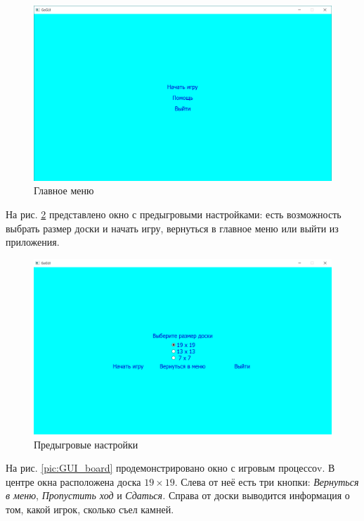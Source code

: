 \begin{figure}[H]
	\begin{center}
		\includegraphics[scale=0.5]{pics/GoGUI/Menu.png}
	    \caption{Главное меню} 
		\label{pic:GUI_Menu}
	\end{center}
\end{figure}

На рис. \ref{pic:GUI_Settings} представлено окно с предыгровыми настройками: есть возможность выбрать размер доски и начать игру, вернуться в главное меню или выйти из приложения.

\begin{figure}[H]
	\begin{center}
		\includegraphics[scale=0.6]{pics/GoGUI/Settings.png}
	    \caption{Предыгровые настройки} 
		\label{pic:GUI_Settings}
	\end{center}
\end{figure}

На рис. \ref{pic:GUI_board} продемонстрировано окно с игровым процессоv. В центре окна расположена доска $19 \times 19$. Слева от неё есть три кнопки: \textit{Вернуться в меню}, \textit{Пропустить ход} и \textit{Сдаться.} Справа от доски выводится информация о том, какой игрок, сколько съел камней.

